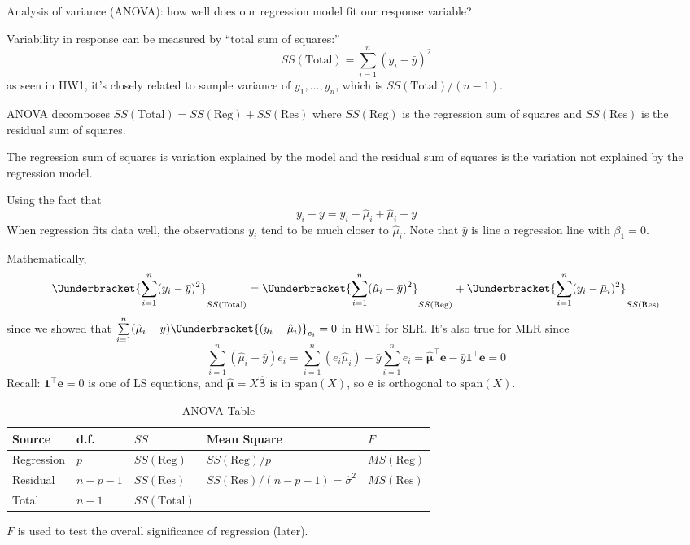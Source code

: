 Analysis of variance (ANOVA): how well
does our regression model fit our
response variable?

Variability in response can be measured by
``total sum of squares:''
\[ SS(\text{Total}) =
    \sum\limits_{i=1}^{n} (y_i-\bar{y})^2 \]
as seen in HW1, it's closely related to
sample variance of $ y_1,\ldots,y_n $,
which is $ SS(\text{Total})/(n-1) $.

ANOVA decomposes $ SS(\text{Total})=SS(\text{Reg})+SS(\text{Res}) $
where $ SS(\text{Reg}) $ is the regression sum of squares
and $ SS(\text{Res}) $ is the residual sum of squares.

The regression sum of squares is variation explained by
the model
and the residual sum of squares is the variation not
explained by the regression model.

Using the fact that
\[ y_i-\bar{y}=y_i-\hat{\mu}_i+\hat{\mu}_i-\bar{y} \]
When regression fits data well,
the observations $ y_i $ tend to be much closer to $ \hat{\mu}_i $.
Note that $ \bar{y} $ is line a regression line with $ \beta_1=0 $.

Mathematically,
\[ \Uunderbracket{\sum\limits_{i=1}^{n} (y_i-\bar{y})^2}_{SS(\text{Total})}
    =\Uunderbracket{\sum\limits_{i=1}^{n} (\hat{\mu}_i-\bar{y})^2}_{SS(\text{Reg})}+
    \Uunderbracket{\sum\limits_{i=1}^{n} (y_i-\bar{\mu}_i)^2}_{SS(\text{Res})} \]
since we showed that $ \sum\limits_{i=1}^{n}(\hat{\mu}_i-\bar{y})
    \Uunderbracket{(y_i-\hat{\mu}_i)}_{e_i}=0 $ in HW1 for SLR\@.
It's also true for MLR since
\[ \sum\limits_{i=1}^{n} (\hat{\mu}_i-\bar{y})e_i=
    \sum\limits_{i=1}^{n} (e_i\hat{\mu}_i)-\bar{y}\sum\limits_{i=1}^{n} e_i
    =\hat{\symbf{\mu}}^\top\symbf{e}-\bar{y}\symbf{1}^\top\symbf{e}=0 \]
Recall: $ \symbf{1}^\top\symbf{e}=0 $ is one of LS equations,
and $ \hat{\symbf{\mu}}=X\hat{\symbf{\beta}} $ is in $ \text{span}(X) $,
so $ \symbf{e} $ is orthogonal to $ \text{span}(X) $.

\begin{table}[H]
    \centering
    \caption{ANOVA Table}
    \begin{tabu} to 0.9\textwidth {Y[0.5]YYY[2]Y}
        \toprule
        Source     & d.f.      & $ SS $               & Mean Square                               & $ F $              \\
        \midrule
        Regression & $ p $     & $ SS(\text{Reg}) $   & $ SS(\text{Reg})/p $                      & $ MS(\text{Reg}) $ \\
        Residual   & $ n-p-1 $ & $ SS(\text{Res}) $   & $ SS(\text{Res})/(n-p-1)=\hat{\sigma}^2 $ & $ MS(\text{Res}) $ \\
        \midrule
        Total      & $ n-1 $   & $ SS(\text{Total}) $                                                                  \\
        \bottomrule
    \end{tabu}
\end{table}
$ F $ is used to test the overall significance of regression (later).

